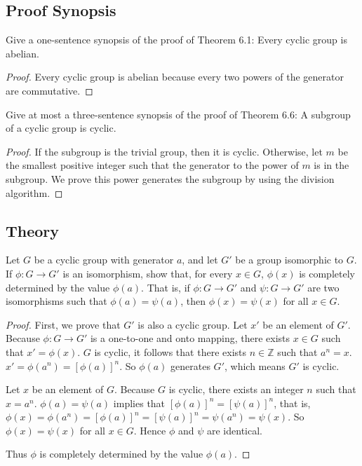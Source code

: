 \subsection*{Proof Synopsis}

\newpage
\begin{exercise}
    Give a one-sentence synopsis of the proof of Theorem 6.1: Every cyclic group is abelian.
\end{exercise}

\begin{proof}
    Every cyclic group is abelian because every two powers of the generator are commutative.
\end{proof}

\newpage
\begin{exercise}
    Give at most a three-sentence synopsis of the proof of Theorem 6.6: A subgroup of a cyclic group is cyclic.
\end{exercise}

\begin{proof}
    If the subgroup is the trivial group, then it is cyclic. Otherwise, let $m$ be the smallest positive integer such that the generator to the power of $m$ is in the subgroup. We prove this power generates the subgroup by using the division algorithm.
\end{proof}

\subsection*{Theory}

\newpage
\begin{exercise}
    Let $G$ be a cyclic group with generator $a$, and let $G'$ be a group isomorphic to $G$. If $\phi: G \to G'$ is an isomorphism, show that, for every $x\in G$, $\phi(x)$ is completely determined by the value $\phi(a)$. That is, if $\phi: G \to G'$ and $\psi: G \to G'$ are two isomorphisms such that $\phi(a) = \psi(a)$, then $\phi(x) = \psi(x)$ for all $x\in G$.
\end{exercise}

\begin{proof}
    First, we prove that $G'$ is also a cyclic group. Let $x'$ be an element of $G'$. Because $\phi: G \to G'$ is a one-to-one and onto mapping, there exists $x\in G$ such that $x' = \phi(x)$. $G$ is cyclic, it follows that there exists $n\in\mathbb{Z}$ such that $a^{n} = x$. $x' = \phi(a^{n}) = {[\phi(a)]}^{n}$. So $\phi(a)$ generates $G'$, which means $G'$ is cyclic.

    Let $x$ be an element of $G$. Because $G$ is cyclic, there exists an integer $n$ such that $x = a^{n}$. $\phi(a) = \psi(a)$ implies that ${[\phi(a)]}^{n} = {[\psi(a)]}^{n}$, that is, $\phi(x) = \phi(a^{n}) = {[\phi(a)]}^{n} = {[\psi(a)]}^{n} = \psi(a^{n}) = \psi(x)$. So $\phi(x) = \psi(x)$ for all $x\in G$. Hence $\phi$ and $\psi$ are identical.

    Thus $\phi$ is completely determined by the value $\phi(a)$.
\end{proof}

